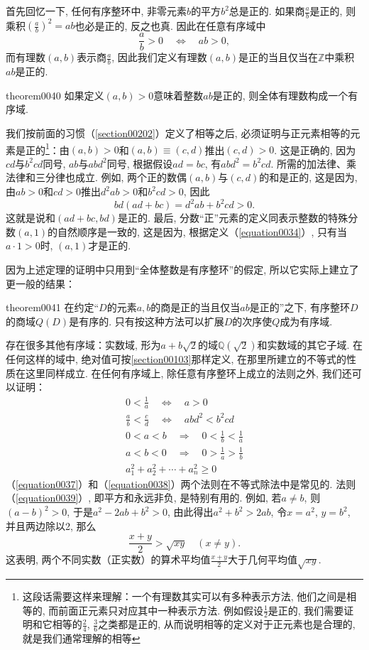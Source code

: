 首先回忆一下, 任何有序整环中, 非零元素$b$的平方$b^2$总是正的. 如果商$\frac{a}{b}$是正的, 则乘积$(\frac{a}{b})^2=ab$也必是正的, 反之也真. 因此在任意有序域中
\begin{equation}\label{equation0034}
\frac{a}{b} > 0 \quad \Leftrightarrow \quad ab>0,
\end{equation}
而有理数$(a, b)$表示商$\frac{a}{b}$, 因此我们定义有理数$(a,b)$是正的当且仅当在$\mathbb{Z}$中乘积$ab$是正的. 
\begin{theorem}{}{theorem0040}
如果定义$(a, b)>0$意味着整数$ab$是正的, 则全体有理数构成一个有序域. 
\end{theorem}
我们按前面的习惯（\ref{section00202}）定义了相等之后, 必须证明与正元素相等的元素是正的\footnote{这段话需要这样来理解：一个有理数其实可以有多种表示方法, 他们之间是相等的, 而前面正元素只对应其中一种表示方法. 例如假设$\frac{1}{2}$是正的, 我们需要证明和它相等的$\frac{2}{4}$, $\frac{3}{6}$之类都是正的, 从而说明相等的定义对于正元素也是合理的, 就是我们通常理解的相等}：由$(a, b)>0$和$(a, b) \equiv (c, d)$推出$(c, d)>0$. 这是正确的, 因为$cd$与$b^2cd$同号, $ab$与$abd^2$同号, 根据假设$ad=bc$, 有$abd^2=b^2cd$. 所需的加法律、乘法律和三分律也成立. 例如, 两个正的数偶$(a, b)$与$(c, d)$的和是正的, 这是因为, 由$ab>0$和$cd>0$推出$d^2ab>0$和$b^2cd>0$, 因此
\[
bd(ad+bc) = d^2ab + b^2cd > 0.
\]
这就是说和$(ad+bc, bd)$是正的. 最后, 分数“正”元素的定义同表示整数的特殊分数$(a, 1)$的自然顺序是一致的, 这是因为, 根据定义（\ref{equation0034}）, 只有当$a \cdot 1 > 0$时, $(a, 1)$才是正的. 

因为上述定理的证明中只用到“全体整数是有序整环”的假定, 所以它实际上建立了更一般的结果：
\begin{theorem}{}{theorem0041}
在约定“$D$的元素$a, b$的商是正的当且仅当$ab$是正的”之下, 有序整环$D$的商域$Q(D)$是有序的. 只有按这种方法可以扩展$D$的次序使$Q$成为有序域. 
\end{theorem}

存在很多其他有序域：实数域, 形为$a+b\sqrt{2}$的域$\mathbb{Q}(\sqrt{2})$和实数域的其它子域. 在任何这样的域中, 绝对值可按\ref{section00103}那样定义, 在那里所建立的不等式的性质在这里同样成立. 在任何有序域上, 除任意有序整环上成立的法则之外, 我们还可以证明：
\begin{gather}
0 < \frac{1}{a} \quad \Leftrightarrow \quad a > 0 \label{equation0035}\\
\frac{a}{b} < \frac{c}{d} \quad \Leftrightarrow \quad abd^2 < b^2cd \label{equation0036}\\
0 < a < b \quad \Rightarrow \quad 0 < \frac{1}{b} < \frac{1}{a} \label{equation0037}\\
a < b < 0 \quad\Rightarrow\quad 0 > \frac{1}{a} > \frac{1}{b} \label{equation0038}\\
a_1^2+a_2^2+\cdots+a_n^2 \ge 0 \label{equation0039}
\end{gather}
（\ref{equation0037}）和（\ref{equation0038}）两个法则在不等式除法中是常见的. 法则（\ref{equation0039}）, 即平方和永远非负, 是特别有用的. 例如, 若$a \neq b$, 则$(a-b)^2>0$, 于是$a^2-2ab+b^2>0$, 由此得出$a^2+b^2 > 2ab$, 令$x=a^2$, $y=b^2$, 并且两边除以2, 那么
\[
\frac{x+y}{2} > \sqrt{xy}\quad(x \neq y).
\]
这表明, 两个不同实数（正实数）的算术平均值$\frac{x+y}{2}$大于几何平均值$\sqrt{xy}$. 

